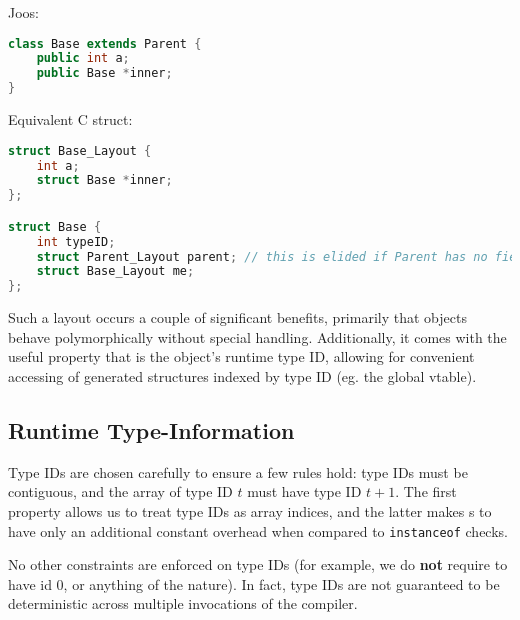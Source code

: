 \documentclass{article}
\begin{document}
Joos:
\begin{lstlisting}[language=java]
class Base extends Parent {
    public int a;
    public Base *inner;
}
\end{lstlisting}

Equivalent C struct:
\begin{lstlisting}[language=C++]
struct Base_Layout {
    int a;
    struct Base *inner;
};

struct Base {
    int typeID;
    struct Parent_Layout parent; // this is elided if Parent has no fields
    struct Base_Layout me;
};
\end{lstlisting}

Such a layout occurs a couple of significant benefits, primarily that objects behave polymorphically without special
handling. Additionally, it comes with the useful property that  is the object's runtime type ID,
allowing for convenient accessing of generated structures indexed by type ID (eg. the global vtable).



\subsection{Runtime Type-Information}
Type IDs are chosen carefully to ensure a few rules hold: type IDs must be contiguous, and the array of type ID $t$ must
have type ID $t + 1$. The first property allows us to treat type IDs as array indices, and the latter makes
s to have only an additional constant overhead when compared to \texttt{instanceof} checks.

No other constraints are enforced on type IDs (for example, we do \textbf{not} require  to have id 0, or
anything of the nature). In fact, type IDs are not guaranteed to be deterministic across multiple invocations of the
compiler.
\end{document}
